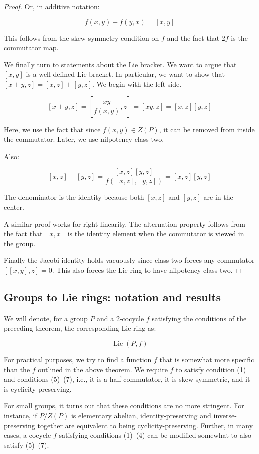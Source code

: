 \documentclass[10pt]{amsart}
\begin{document}
\begin{proof}
  Or, in additive notation:

  $$f(x,y) - f(y,x) = [x,y]$$

  This follows from the skew-symmetry condition on $f$ and the fact
  that $2f$ is the commutator map.

  We finally turn to statements about the Lie bracket. We want to
  argue that $[x,y]$ is a well-defined Lie bracket. In particular, we
  want to show that $[x + y,z] = [x,z] + [y,z]$. We begin with the left side.

  $$[x + y,z] = [\frac{xy}{f(x,y)},z] = [xy,z] = [x,z][y,z]$$

  Here, we use the fact that since $f(x,y) \in Z(P)$, it can be
  removed from inside the commutator. Later, we use nilpotency class two.

  Also:

  $$[x,z] + [y,z] = \frac{[x,z][y,z]}{f([x,z],[y,z])} = [x,z][y,z]$$

  The denominator is the identity because both $[x,z]$ and $[y,z]$ are
  in the center.

  A similar proof works for right linearity. The alternation property
  follows from the fact that $[x,x]$ is the identity element when the
  commutator is viewed in the group.

  Finally the Jacobi identity holds vacuously since class two forces
  any commutator $[[x,y],z] = 0$. This also forces the Lie ring to
  have nilpotency class two.
\end{proof}

\subsection{Groups to Lie rings: notation and results}

We will denote, for a group $P$ and a 2-cocycle $f$ satisfying the
conditions of the preceding theorem, the corresponding Lie ring as:

$$\operatorname{Lie}(P,f)$$

For practical purposes, we try to find a function $f$ that is somewhat
more specific than the $f$ outlined in the above theorem. We require
$f$ to satisfy condition (1) and conditions (5)--(7), i.e., it is a
half-commutator, it is skew-symmetric, and it is cyclicity-preserving.

For small groups, it turns out that these conditions are no more
stringent. For instance, if $P/Z(P)$ is elementary abelian,
identity-preserving and inverse-preserving together are equivalent to
being cyclicity-preserving. Further, in many cases, a cocycle $f$
satisfying conditions (1)--(4) can be modified somewhat to also
satisfy (5)--(7).
\end{document}
